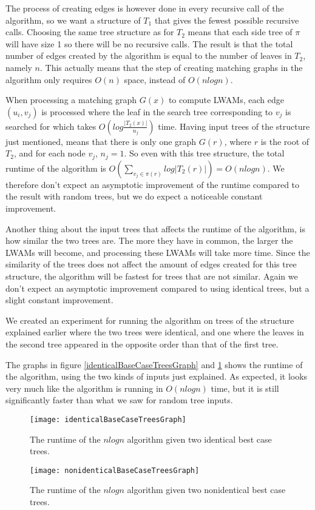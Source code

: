 The process of creating edges is however done in every recursive call of the algorithm, so we want a structure of $T_1$ that gives the fewest possible recursive calls. Choosing the same tree structure as for $T_2$ means that each side tree of $\pi$ will have size 1 so there will be no recursive calls. The result is that the total number of edges created by the algorithm is equal to the number of leaves in $T_2$, namely $n$. This actually means that the step of creating matching graphs in the algorithm only requires $O(n)$ space, instead of $O(nlogn)$.

When processing a matching graph $G(x)$ to compute LWAMs, each edge $(u_i, v_j)$ is processed where the leaf in the search tree corresponding to $v_j$ is searched for which takes $O(log\frac{|T_2(x)|}{n_j})$ time. Having input trees of the structure just mentioned, means that there is only one graph $G(r)$, where $r$ is the root of $T_2$, and for each node $v_j$, $n_j = 1$. So even with this tree structure, the total runtime of the algorithm is $O(\sum_{v_j \in \pi(r)} log |T_2(r)|) = O(nlogn)$. We therefore don't expect an asymptotic improvement of the runtime compared to the result with random trees, but we do expect a noticeable constant improvement.

Another thing about the input trees that affects the runtime of the algorithm, is how similar the two trees are. The more they have in common, the larger the LWAMs will become, and processing these LWAMs will take more time. Since the similarity of the trees does not affect the amount of edges created for this tree structure, the algorithm will be fastest for trees that are not similar. Again we don't expect an asymptotic improvement compared to using identical trees, but a slight constant improvement.

We created an experiment for running the algorithm on trees of the structure explained earlier where the two trees were identical, and one where the leaves in the second tree appeared in the opposite order than that of the first tree.

The graphs in figure \ref{identicalBaseCaseTreesGraph} and \ref{nonidenticalBaseCaseTreesGraph} shows the runtime of the algorithm, using the two kinds of inputs just explained. As expected, it looks very much like the algorithm is running in $O(nlogn)$ time, but it is still significantly faster than what we saw for random tree inputs.

\begin{figure}
	\texttt{[image: identicalBaseCaseTreesGraph]}
	\caption{The runtime of the $nlogn$ algorithm given two identical best case trees.}
	\label{identicalBaseCaseTreesGraph}
	\texttt{[image: nonidenticalBaseCaseTreesGraph]}
	\caption{The runtime of the $nlogn$ algorithm given two nonidentical best case trees.}
	\label{nonidenticalBaseCaseTreesGraph}
\end{figure}

